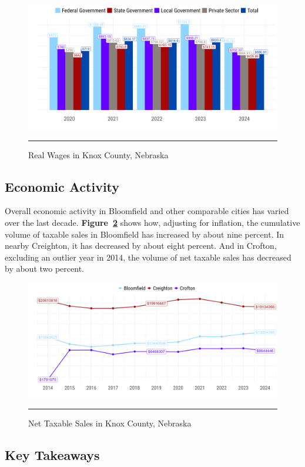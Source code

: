 \begin{figure}[H]
\centering
\begin{framed}
    \caption{Real Wages in Knox County, Nebraska}
    \label{fig:wages}
    \includegraphics[width=\linewidth]{figures/avg_weekly_wage.png}
    \rule[-5pt]{\linewidth}{0.4pt}
\end{framed}
\end{figure}

\subsection{Economic Activity}

\noindent Overall economic activity in Bloomfield and other comparable cities has varied over the last decade. \textbf{Figure~\ref{fig:netTaxableSales}} shows how, adjusting for inflation, the cumulative volume of taxable sales in Bloomfield has increased by about nine percent. In nearby Creighton, it has decreased by about eight percent. And in Crofton, excluding an outlier year in 2014, the volume of net taxable sales has decreased by about two percent.

\begin{figure}[H]
\centering
\begin{framed}
    \caption{Net Taxable Sales in Knox County, Nebraska}
    \label{fig:netTaxableSales}
    \includegraphics[width=\linewidth]{figures/net_taxable_sales.png}
    \rule[-5pt]{\linewidth}{0.4pt}
\end{framed}
\end{figure}

\pagebreak
\subsection*{Key Takeaways}